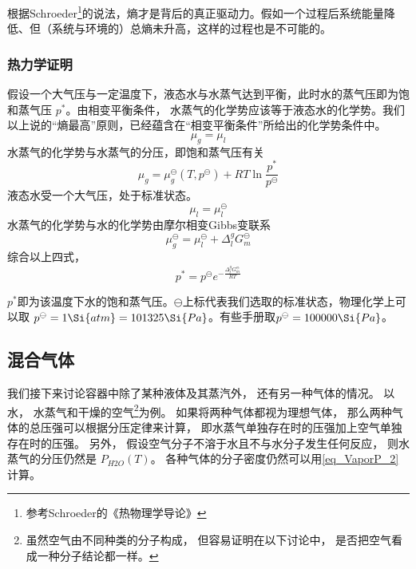 根据Schroeder\footnote{参考Schroeder的《热物理学导论》}的说法，熵才是背后的真正驱动力。假如一个过程后系统能量降低、但（系统与环境的）总熵未升高，这样的过程也是不可能的。

\subsubsection{热力学证明}
假设一个大气压与一定温度下，液态水与水蒸气达到平衡，此时水的蒸气压即为饱和蒸气压 $p^*$。由相变平衡条件， 水蒸气的化学势应该等于液态水的化学势。我们以上说的“熵最高”原则，已经蕴含在“相变平衡条件”所给出的化学势条件中。
$$
\mu_g = \mu_l
$$
水蒸气的化学势与水蒸气的分压，即饱和蒸气压有关
$$
\mu_g= \mu_g^\ominus(T,p^\ominus) + RT \ln \frac{p^*}{p^\ominus}
$$
液态水受一个大气压，处于标准状态。
$$
\mu_l = \mu_l^\ominus
$$
水蒸气的化学势与水的化学势由摩尔相变Gibbs变联系 
$$
\mu_g^\ominus = \mu_l^\ominus + \Delta_l^g G_m^\ominus
$$
综合以上四式，
$$p^* = p^\ominus e^{-\frac{\Delta_l^g G_m^\ominus}{RT}}$$

$p^*$即为该温度下水的饱和蒸气压。$\ominus$上标代表我们选取的标准状态，物理化学上可以取 $p^\ominus = 1 \Si{atm} = 101325 \Si{Pa}$。有些手册取$p^\ominus = 100000 \Si{Pa}$。





\subsection{混合气体}

我们接下来讨论容器中除了某种液体及其蒸汽外， 还有另一种气体的情况。 以水， 水蒸气和干燥的空气\footnote{虽然空气由不同种类的分子构成， 但容易证明在以下讨论中， 是否把空气看成一种分子结论都一样。}为例。 如果将两种气体都视为理想气体， 那么两种气体的总压强可以根据分压定律来计算， 即水蒸气单独存在时的压强加上空气单独存在时的压强。 另外， 假设空气分子不溶于水且不与水分子发生任何反应， 则水蒸气的分压仍然是 $P_{H2O}(T)$。 各种气体的分子密度仍然可以用\autoref{eq_VaporP_2} 计算。

